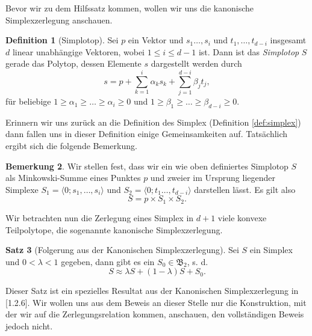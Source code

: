 \documentclass[11pt,titlepage]{article}
\theoremstyle{definition}
\newtheorem{theorem}{Satz}[section]
\newtheorem{definition}[theorem]{Definition}
\newtheorem{remark}[theorem]{Bemerkung}
\theoremstyle{remark}
\begin{document}
	Bevor wir zu dem Hilfssatz kommen, wollen wir uns die kanonische 
	Simplexzerlegung anschauen. 
		
	\begin{definition}[Simplotop]
		Sei $p$ ein Vektor und  $s_1\ldots,s_i$ und 
		$t_1,\ldots,t_{d-i}$ insgesamt 
		$d$ linear unabhängige Vektoren, wobei $1\leq i\leq d-1$ ist. Dann ist 
		das \textsl{Simplotop} $S$ gerade das Polytop, dessen Elemente $s$ 
		dargestellt werden durch
		\[s=p+\sum_{k=1}^i \alpha_k s_k +\sum_{j=1}^{d-i}\beta_j t_j,\]
		für beliebige $1\geq \alpha_1\geq\ldots\geq\alpha_i\geq 0$ und 
		$1\geq \beta_1\geq\ldots\geq\beta_{d-i}\geq 0$.
	\end{definition}
	
	Erinnern wir uns zurück an die Definition des Simplex (Definition \ref{def:simplex}) dann fallen uns in dieser Definition einige Gemeinsamkeiten 
	auf. Tatsächlich ergibt sich die folgende Bemerkung.
	
	\begin{remark}
		Wir stellen fest, dass wir ein wie oben definiertes Simplotop $S$ 
		als Minkowski-Summe eines Punktes $p$ und zweier 
		im Ursprung liegender Simplexe $S_1=\langle 0;s_1,\ldots,s_i\rangle$ 
		und $S_2=\langle 0;t_1\ldots,t_{d-i}\rangle$ darstellen lässt. 
		Es gilt also 
		\[S=p\times S_1 \times S_2.\]
	\end{remark}
	
	Wir betrachten nun die Zerlegung eines Simplex in $d+1$ viele konvexe 
	Teilpolytope, die sogenannte kanonische Simplexzerlegung. 
	
	\begin{theorem}[Folgerung aus der Kanonischen Simplexzerlegung]\label{thm:kanonsimpl}
		Sei $S$ ein Simplex und $0<\lambda<1$ gegeben, dann 
		gibt es ein $S_0\in\mathfrak{B}_2$, s. d.
		\[S\approx \lambda S+(1-\lambda)S +S_0.\]
	\end{theorem}
	
	Dieser Satz ist ein spezielles Resultat aus der Kanonischen Simplexzerlegung 
	in \cite{Hadwiger}[1.2.6]. Wir wollen uns aus dem Beweis an dieser 
	Stelle nur die Konstruktion, mit 
	der wir auf die Zerlegungsrelation kommen, anschauen, den vollständigen 
	Beweis jedoch nicht.
	
\end{document}
